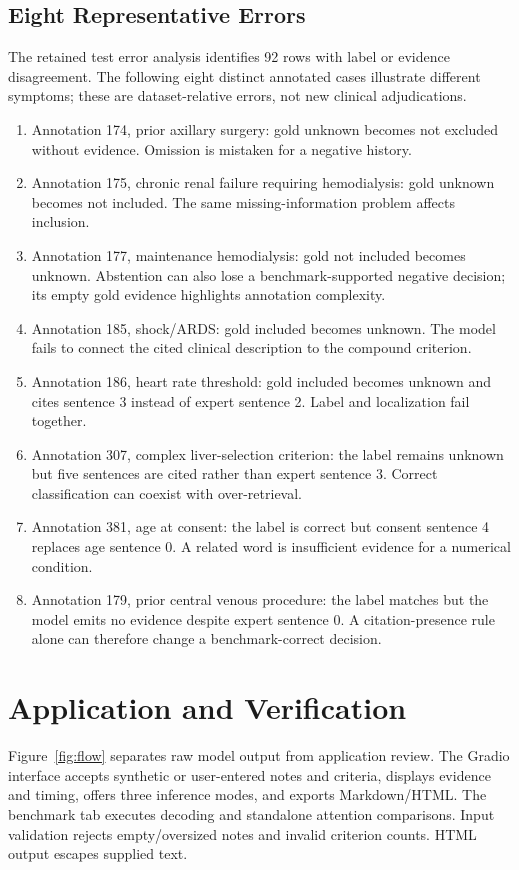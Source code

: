 \documentclass[conference]{IEEEtran}
\begin{document}
\subsection{Eight Representative Errors}
The retained test error analysis identifies 92 rows with label or evidence disagreement. The following eight distinct annotated cases illustrate different symptoms; these are dataset-relative errors, not new clinical adjudications.
\begin{enumerate}
\item Annotation 174, prior axillary surgery: gold unknown becomes not excluded without evidence. Omission is mistaken for a negative history.
\item Annotation 175, chronic renal failure requiring hemodialysis: gold unknown becomes not included. The same missing-information problem affects inclusion.
\item Annotation 177, maintenance hemodialysis: gold not included becomes unknown. Abstention can also lose a benchmark-supported negative decision; its empty gold evidence highlights annotation complexity.
\item Annotation 185, shock/ARDS: gold included becomes unknown. The model fails to connect the cited clinical description to the compound criterion.
\item Annotation 186, heart rate threshold: gold included becomes unknown and cites sentence 3 instead of expert sentence 2. Label and localization fail together.
\item Annotation 307, complex liver-selection criterion: the label remains unknown but five sentences are cited rather than expert sentence 3. Correct classification can coexist with over-retrieval.
\item Annotation 381, age at consent: the label is correct but consent sentence 4 replaces age sentence 0. A related word is insufficient evidence for a numerical condition.
\item Annotation 179, prior central venous procedure: the label matches but the model emits no evidence despite expert sentence 0. A citation-presence rule alone can therefore change a benchmark-correct decision.
\end{enumerate}

\section{Application and Verification}
Figure~\ref{fig:flow} separates raw model output from application review. The Gradio interface accepts synthetic or user-entered notes and criteria, displays evidence and timing, offers three inference modes, and exports Markdown/HTML. The benchmark tab executes decoding and standalone attention comparisons. Input validation rejects empty/oversized notes and invalid criterion counts. HTML output escapes supplied text.
\end{document}
